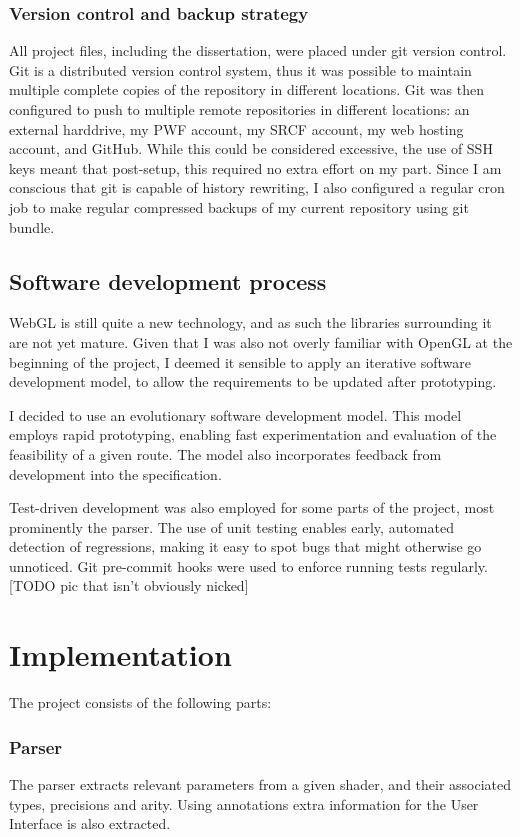 \documentclass[12pt,twoside,notitlepage]{report}
\begin{document}
\subsection{Version control and backup strategy}
All project files, including the dissertation, were placed under git version control. Git is a distributed version control system, thus it was possible to maintain multiple complete copies of the repository in different locations. Git was then configured to push to multiple remote repositories in different locations: an external harddrive, my PWF account, my SRCF account, my web hosting account, and GitHub. While this could be considered excessive, the use of SSH keys meant that post-setup, this required no extra effort on my part. Since I am conscious that git is capable of history rewriting, I also configured a regular cron job to make regular compressed backups of my current repository using git bundle.

\section{Software development process}
WebGL is still quite a new technology, and as such the libraries surrounding it are not yet mature. Given that I was also not overly familiar with OpenGL at the beginning of the project, I deemed it sensible to apply an iterative software development model, to allow the requirements to be updated after prototyping. 

I decided to use an evolutionary software development model. This model employs rapid prototyping, enabling fast experimentation and evaluation of the feasibility of a given route. The model also incorporates feedback from development into the specification.

Test-driven development was also employed for some parts of the project, most prominently the parser. The use of unit testing enables early, automated detection of regressions, making it easy to spot bugs that might otherwise go unnoticed. Git pre-commit hooks were used to enforce running tests regularly. [TODO pic that isn't obviously nicked]


\cleardoublepage
\chapter{Implementation}
The project consists of the following parts:
\subsection*{Parser}
The parser extracts relevant parameters from a given shader, and their associated types, precisions and arity. Using annotations extra information for the User Interface is also extracted.
\end{document}
